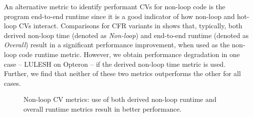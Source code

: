 An alternative
metric to identify performant CVs for non-loop code is the program
end-to-end runtime since it is a good indicator of how non-loop and
hot-loop CVs interact.
Comparisons for CFR variants in 
shows that, typically, both derived non-loop time (denoted
as \emph{Non-loop}) and end-to-end runtime (denoted as
\emph{Overall}) result in a significant performance improvement,
when used as the non-loop code runtime metric.  However, we obtain
 performance degradation in one case -- LULESH on Opteron -- if the
derived non-loop time metric is used.  Further, we find that
neither of these two metrics outperforms the other for all cases.
\vspace{2pt}
\begin{figure}
\centering
{}

\vspace{-2mm}
\caption{Non-loop CV metrics: use of both derived non-loop runtime and overall runtime
metrics result in better performance.}
\label{fig:sensitivity}
\vspace{-4mm}
\end{figure}

